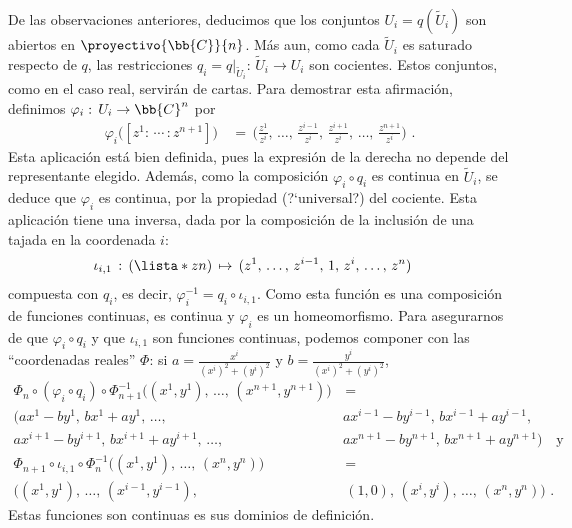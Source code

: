 \begin{ejemplo}
	De las observaciones anteriores, deducimos que los conjuntos
	$U_{i}=q(\widetilde{U}_{i})$ son abiertos en $\proyectivo{\bb{C}}{n}$.
	M\'{a}s aun, como cada $\widetilde{U}_{i}$ es saturado respecto
	de $q$, las restricciones $q_{i}=q|_{\widetilde{U}_{i}}:\,%
	\widetilde{U}_{i}\rightarrow U_{i}$ son cocientes. Estos conjuntos,
	como en el caso real, servir\'{a}n de cartas. Para demostrar esta
	afirmaci\'{o}n, definimos
	$\varphi_{i}:\,U_{i}\rightarrow\bb{C}^{n}$ por
	\begin{align*}
		\varphi_{i}\big(\left[z^{1}:\,\cdots\,:z^{n+1}\right]\big) &
			\,=\,\big(\frac{z^{1}}{z^{i}},\,\dots,\,
			\frac{z^{i-1}}{z^{i}},\,\frac{z^{i+1}}{z^{i}},
			\,\dots,\,\frac{z^{n+1}}{z^{i}}\big)
		\text{ .}
	\end{align*}
	Esta aplicaci\'{o}n est\'{a} bien definida, pues la expresi\'{o}n
	de la derecha no depende del representante elegido. Adem\'{a}s,
	como la composici\'{o}n $\varphi_{i}\circ q_{i}$ es continua en
	$\widetilde{U}_{i}$, se deduce que $\varphi_{i}$ es continua,
	por la propiedad (?`universal?) del cociente. Esta aplicaci\'{o}n
	tiene una inversa, dada por la composici\'{o}n de la inclusi\'{o}n
	de una tajada en la coordenada $i$:
	\begin{align*}
		\iota_{i,1} & \,:\,
			(\lista*{z}{n})\,\mapsto\,(z^{1},\,\dots,\,z^{i-1},\,
			1,\,z^{i},\,\dots,\,z^{n})
	\end{align*}
	compuesta con $q_{i}$, es decir,
	$\varphi_{i}^{-1}=q_{i}\circ\iota_{i,1}$. Como esta funci\'{o}n es una
	composici\'{o}n de funciones continuas, es continua y $\varphi_{i}$ es
	un homeomorfismo. Para asegurarnos de que $\varphi_{i}\circ q_{i}$ y
	que $\iota_{i,1}$ son funciones continuas, podemos componer con las
	``coordenadas reales'' $\Phi$: si
	$a=\frac{x^{i}}{(x^{i})^{2}+(y^{i})^{2}}$ y
	$b=\frac{y^{i}}{(x^{i})^{2}+(y^{i})^{2}}$,
	\begin{align*}
		\Phi_{n}\circ(\varphi_{i}\circ q_{i})\circ\Phi_{n+1}^{-1}
		\big((x^{1},y^{1}),\,\dots,\,(x^{n+1},y^{n+1})\big) & \,=\, \\
		\big(ax^{1}-by^{1},\,bx^{1}+ay^{1}, \,\dots,\,
		& ax^{i-1}-by^{i-1},\,bx^{i-1}+ay^{i-1},\, \\
		ax^{i+1}-by^{i+1},\,bx^{i+1}+ay^{i+1},\,\dots,\,
		& ax^{n+1}-by^{n+1},\,bx^{n+1}+ay^{n+1}\big)
		\quad\text{y} \\
		\Phi_{n+1}\circ\iota_{i,1}\circ\Phi_{n}^{-1}
		\big((x^{1},y^{1}),\,\dots,\,(x^{n},y^{n})\big) & \,=\, \\
		\big((x^{1},y^{1}),\,\dots,\,(x^{i-1},y^{i-1}), & \,(1,0),\,
		(x^{i},y^{i}),\,\dots,\,(x^{n},y^{n})\big)
		\text{ .}
	\end{align*}
	Estas funciones son continuas es sus dominios de definici\'{o}n.


\end{ejemplo}
